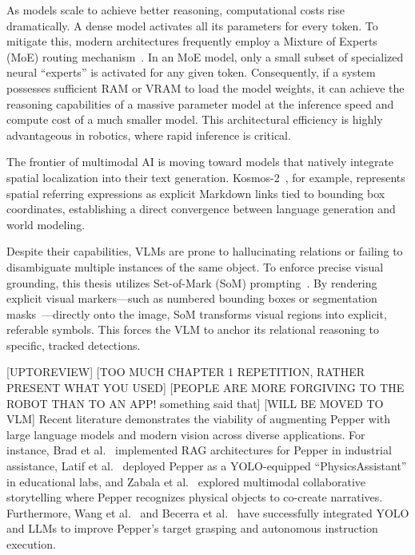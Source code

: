 As models scale to achieve better reasoning, computational costs rise dramatically. A dense model activates all its parameters for every token. To mitigate this, modern architectures frequently employ a Mixture of Experts (MoE) routing mechanism~\cite{shazeer2017outrageouslylargeneuralnetworks}. In an MoE model, only a small subset of specialized neural ``experts'' is activated for any given token. Consequently, if a system possesses sufficient RAM or VRAM to load the model weights, it can achieve the reasoning capabilities of a massive parameter model at the inference speed and compute cost of a much smaller model. This architectural efficiency is highly advantageous in robotics, where rapid inference is critical.


The frontier of multimodal AI is moving toward models that natively integrate spatial localization into their text generation. Kosmos-2~\cite{peng_kosmos-2_2023}, for example, represents spatial referring expressions as explicit Markdown links tied to bounding box coordinates, establishing a direct convergence between language generation and world modeling.

Despite their capabilities, VLMs are prone to hallucinating relations or failing to disambiguate multiple instances of the same object. To enforce precise visual grounding, this thesis utilizes Set-of-Mark (SoM) prompting~\cite{yang_set-of-mark_2023}. By rendering explicit visual markers---such as numbered bounding boxes or segmentation masks~\cite{kirillov_segment_2023}---directly onto the image, SoM transforms visual regions into explicit, referable symbols. This forces the VLM to anchor its relational reasoning to specific, tracked detections.


[UPTOREVIEW]
[TOO MUCH CHAPTER 1 REPETITION, RATHER PRESENT WHAT YOU USED]
[PEOPLE ARE MORE FORGIVING TO THE ROBOT THAN TO AN APP! something said that]
[WILL BE MOVED TO VLM]
Recent literature demonstrates the viability of augmenting Pepper with large language models and modern vision across diverse applications. For instance, Brad et al.~\cite{brad_retrieval-augmented_2025} implemented RAG architectures for Pepper in industrial assistance, Latif et al.~\cite{latif_physicsassistant_2024} deployed Pepper as a YOLO-equipped \enquote{PhysicsAssistant} in educational labs, and Zabala et al.~\cite{zabala_exploring_2025} explored multimodal collaborative storytelling where Pepper recognizes physical objects to co-create narratives. Furthermore, Wang et al.~\cite{wang_target_2024} and Becerra et al.~\cite{becerra_improving_2024} have successfully integrated YOLO and LLMs to improve Pepper's target grasping and autonomous instruction execution.


